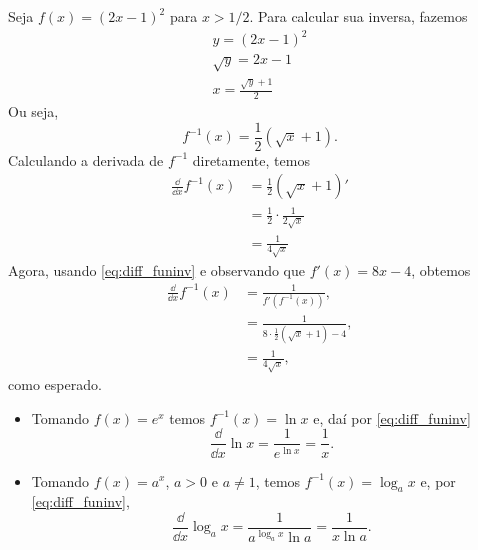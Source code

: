 \begin{ex}
  Seja $f(x) = (2x-1)^2$ para $x>1/2$. Para calcular sua inversa, fazemos
  \begin{gather}
    y = (2x-1)^2 \\
    \sqrt{y} = 2x-1 \\
    x = \frac{\sqrt{y}+1}{2}
  \end{gather}
  Ou seja,
  \begin{equation}
    f^{-1}(x) = \frac{1}{2}(\sqrt{x}+1).
  \end{equation}
  Calculando a derivada de $f^{-1}$ diretamente, temos
  \begin{align}
    \frac{\dd}{\dd x}f^{-1}(x) &= \frac{1}{2}\left(\sqrt{x}+1\right)' \\
                               &= \frac{1}{2}\cdot\frac{1}{2\sqrt{x}} \\
                               &= \frac{1}{4\sqrt{x}}
  \end{align}
  Agora, usando \eqref{eq:diff_funinv} e observando que $f'(x) = 8x-4$, obtemos
  \begin{align}
    \frac{\dd}{\dd x}f^{-1}(x) &= \frac{1}{f'(f^{-1}(x))},\\
                               &= \frac{1}{8\cdot \frac{1}{2}\left(\sqrt{x}+1\right)-4}, \\
                               &= \frac{1}{4\sqrt{x}},
  \end{align}
  como esperado.
\end{ex}

\begin{obs}
  \begin{itemize}
  \item Tomando $f(x) = e^x$ temos $f^{-1}(x) = \ln x$ e, daí por \eqref{eq:diff_funinv}
    \begin{equation}
      \frac{\dd }{\dd x}\ln x = \frac{1}{e^{\ln x}} = \frac{1}{x}.
    \end{equation}
  \item Tomando $f(x) = a^x$, $a> 0$ e $a\neq 1$, temos $f^{-1}(x) = \log_a x$ e, por \eqref{eq:diff_funinv},
    \begin{equation}
      \frac{\dd}{\dd x}\log_a x = \frac{1}{a^{\log_a x}\ln a} = \frac{1}{x\ln a}.
    \end{equation}
  \end{itemize}
\end{obs}

